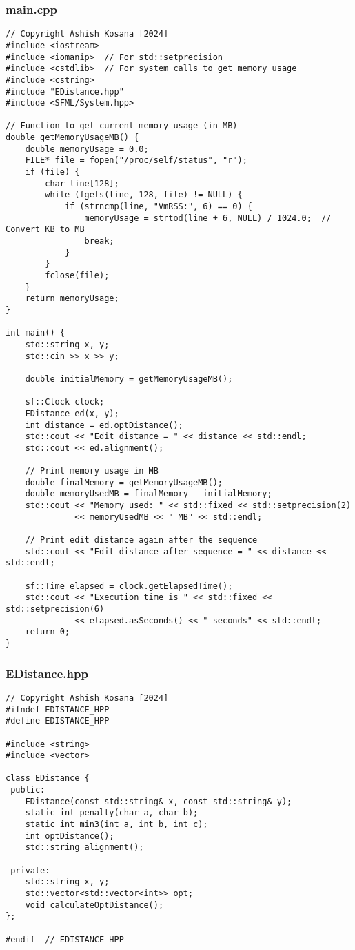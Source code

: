 \documentclass[12pt]{article}
\begin{document}
\subsubsection{main.cpp}
\begin{lstlisting}[style=cppcode]
// Copyright Ashish Kosana [2024]
#include <iostream>
#include <iomanip>  // For std::setprecision
#include <cstdlib>  // For system calls to get memory usage
#include <cstring>
#include "EDistance.hpp"
#include <SFML/System.hpp>

// Function to get current memory usage (in MB)
double getMemoryUsageMB() {
    double memoryUsage = 0.0;
    FILE* file = fopen("/proc/self/status", "r");
    if (file) {
        char line[128];
        while (fgets(line, 128, file) != NULL) {
            if (strncmp(line, "VmRSS:", 6) == 0) {
                memoryUsage = strtod(line + 6, NULL) / 1024.0;  // Convert KB to MB
                break;
            }
        }
        fclose(file);
    }
    return memoryUsage;
}

int main() {
    std::string x, y;
    std::cin >> x >> y;

    double initialMemory = getMemoryUsageMB();

    sf::Clock clock;
    EDistance ed(x, y);
    int distance = ed.optDistance();
    std::cout << "Edit distance = " << distance << std::endl;
    std::cout << ed.alignment();

    // Print memory usage in MB
    double finalMemory = getMemoryUsageMB();
    double memoryUsedMB = finalMemory - initialMemory;
    std::cout << "Memory used: " << std::fixed << std::setprecision(2)
              << memoryUsedMB << " MB" << std::endl;

    // Print edit distance again after the sequence
    std::cout << "Edit distance after sequence = " << distance << std::endl;

    sf::Time elapsed = clock.getElapsedTime();
    std::cout << "Execution time is " << std::fixed << std::setprecision(6)
              << elapsed.asSeconds() << " seconds" << std::endl;
    return 0;
}

\end{lstlisting}
\subsubsection{EDistance.hpp}
\begin{lstlisting}[style=cppcode]
// Copyright Ashish Kosana [2024]
#ifndef EDISTANCE_HPP
#define EDISTANCE_HPP

#include <string>
#include <vector>

class EDistance {
 public:
    EDistance(const std::string& x, const std::string& y);
    static int penalty(char a, char b);
    static int min3(int a, int b, int c);
    int optDistance();
    std::string alignment();

 private:
    std::string x, y;
    std::vector<std::vector<int>> opt;
    void calculateOptDistance();
};

#endif  // EDISTANCE_HPP
\end{lstlisting}
\newpage
\end{document}
